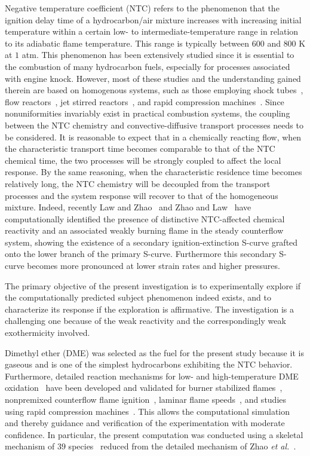 \documentclass[review,3p,times]{elsarticleUS}
\begin{document}
Negative temperature coefficient (NTC) refers to the phenomenon that the ignition delay time of a hydrocarbon/air mixture increases with increasing initial temperature within a certain low- to intermediate-temperature range in relation to its adiabatic flame temperature.  This range is typically between $600$ and $800$ K at $1$ atm.  This phenomenon has been extensively studied since it is essential to the combustion of many hydrocarbon fuels, especially for processes associated with engine knock. However, most of these studies and the understanding gained therein are based on homogenous systems, such as those employing shock tubes~\cite{ciezki93}, flow reactors~\cite{wada11}, jet stirred reactors~\cite{veloo13}, and rapid compression machines~\cite{mittal08}.  Since nonuniformities invariably exist in practical combustion systems, the coupling between the NTC chemistry and convective-diffusive transport processes needs to be considered.  It is reasonable to expect that in a chemically reacting flow, when the characteristic transport time becomes comparable to that of the NTC chemical time, the two processes will be strongly coupled to affect the local response.  By the same reasoning, when the characteristic residence time becomes relatively long, the NTC chemistry will be decoupled from the transport processes and the system response will recover to that of the homogeneous mixture.  Indeed, recently Law and Zhao~\cite{law12} and Zhao and Law~\cite{zhao13} have computationally identified the presence of distinctive NTC-affected chemical reactivity and an associated weakly burning flame in the steady counterflow system, showing the existence of a secondary ignition-extinction S-curve grafted onto the lower branch of the primary S-curve. Furthermore this secondary S-curve becomes more pronounced at lower strain rates and higher pressures.

The primary objective of the present investigation is to experimentally explore if the computationally predicted subject phenomenon indeed exists, and to characterize its response if the exploration is affirmative.  The investigation is a challenging one because of the weak reactivity and the correspondingly weak exothermicity involved.

Dimethyl ether (DME) was selected as the fuel for the present study because it is gaseous and is one of the simplest hydrocarbons exhibiting the NTC behavior.  Furthermore, detailed reaction mechanisms for low- and high-temperature DME oxidation~\cite{curran98,fischer00,curran00,zhao08} have been developed and validated for burner stabilized flames~\cite{kaiser00}, nonpremixed counterflow flame ignition~\cite{zheng05}, laminar flame speeds~\cite{qin05}, and studies using rapid compression machines~\cite{mittal08}.  This allows the computational simulation and thereby guidance and verification of the experimentation with moderate confidence. In particular, the present computation was conducted using a skeletal mechanism of $39$ species~\cite{bansal11} reduced from the detailed mechanism of Zhao \emph{et al.}~\cite{zhao08}.
\end{document}
